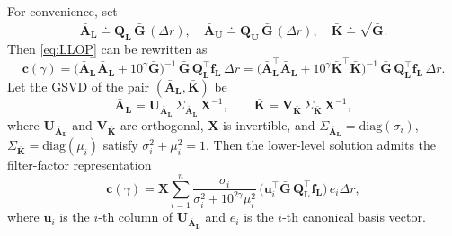 \documentclass[12pt]{article}
\numberwithin{equation}{section}
\numberwithin{theorem}{section}
\begin{document}
For convenience, set
\begin{equation}
\label{eq:ALU}
\bar{\mathbf{A}}_{\mathbf{L}} \doteq \mathbf{Q}_{\mathbf{L}}\,\bar{\mathbf{G}}\,(\Delta r),
\quad
\bar{\mathbf{A}}_{\mathbf{U}} \doteq \mathbf{Q}_{\mathbf{U}}\,\bar{\mathbf{G}}\,(\Delta r), \quad \bar{\mathbf{K}}\doteq \sqrt{\bar{\mathbf{G}}}.
\end{equation}
Then \eqref{eq:LLOP} can be rewritten as
\begin{equation}
\label{eq:clower}
\mathbf{c}(\gamma)
= \big(\bar{\mathbf{A}}_{\mathbf{L}}^{\top}\bar{\mathbf{A}}_{\mathbf{L}}+10^{\gamma}\bar{\mathbf{G}}\big)^{-1}
\,\bar{\mathbf{G}}\,\mathbf{Q}_{\mathbf{L}}^{\top}\mathbf{f}_{\mathbf{L}}\,\Delta r
= \big(\bar{\mathbf{A}}_{\mathbf{L}}^{\top}\bar{\mathbf{A}}_{\mathbf{L}}+10^{\gamma}\bar{\mathbf{K}}^{\top}\bar{\mathbf{K}}\big)^{-1}
\,\bar{\mathbf{G}}\,\mathbf{Q}_{\mathbf{L}}^{\top}\mathbf{f}_{\mathbf{L}}\,\Delta r.
\end{equation}
Let the GSVD of the pair \((\bar{\mathbf{A}}_{\mathbf{L}},\bar{\mathbf{K}})\) be
\[
\bar{\mathbf{A}}_{\mathbf{L}}=\mathbf{U}_{\bar{\mathbf{A}}_{\mathbf{L}}}\,\Sigma_{\bar{\mathbf{A}}_{\mathbf{L}}}\,\mathbf{X}^{-1},
\qquad
\bar{\mathbf{K}}=\mathbf{V}_{\bar{\mathbf{K}}}\,\Sigma_{\bar{\mathbf{K}}}\,\mathbf{X}^{-1},
\]
where \(\mathbf{U}_{\bar{\mathbf{A}}_{\mathbf{L}}}\) and \(\mathbf{V}_{\bar{\mathbf{K}}}\) are orthogonal, \(\mathbf{X}\) is invertible, and 
\(\Sigma_{\bar{\mathbf{A}}_{\mathbf{L}}}=\mathrm{diag}(\sigma_i)\), \(\Sigma_{\bar{\mathbf{K}}}=\mathrm{diag}(\mu_i)\) satisfy \(\sigma_i^{2}+\mu_i^{2}=1\). Then the lower-level solution admits the filter-factor representation \cite[Eq.~(2.19)]{hansen1994regularization}
\begin{equation}
\label{eq:lowersolver}
\mathbf{c}(\gamma)
=\mathbf{X}\sum_{i=1}^{n}\frac{\sigma_i}{\sigma_i^{2}+10^{2\gamma}\mu_i^{2}}\,
\big(\mathbf{u}_i^{\top}\bar{\mathbf{G}}\,\mathbf{Q}_{\mathbf{L}}^{\top}\mathbf{f}_{\mathbf{L}}\big)\,e_i \Delta r,
\end{equation}
where \(\mathbf{u}_i\) is the \(i\)-th column of \(\mathbf{U}_{\bar{\mathbf{A}}_{\mathbf{L}}}\) and \(e_i\) is the \(i\)-th canonical basis vector.
\end{document}
